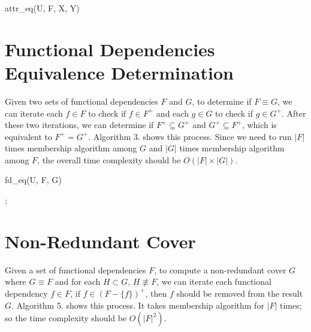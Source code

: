 \documentclass[11pt]{book}
\begin{document}
\begin{algorithm}

  \caption{attr\_eq(U, F, X, Y)}
  
  \SetAlgoLined
    
  
\end{algorithm}

\section{Functional Dependencies Equivalence Determination}

Given two sets of functional dependencies $F$ and $G$, to determine if $F \equiv G$, we can iterate each $f \in F$ to check if $f \in F^{+}$ and each $g \in G$ to check if $g \in G^{+}$. After these two iterations, we can determine if $F^{+} \subseteq G^{+}$ and $G^{+} \subseteq F^{+}$, which is equivalent to $F^{+} = G^{+}$. Algorithm 3. shows this process. Since we need to run $|F|$ times membership algorithm among $G$ and $|G|$ times membership algorithm among $F$, the overall time complexity should be $O(|F| \times |G|)$.

\begin{algorithm}

  \caption{fd\_eq(U, F, G)}
  
  \SetAlgoLined
  
  

  ;
  
\end{algorithm}

\section{Non-Redundant Cover}

Given a set of functional dependencies $F$, to compute a non-redundant cover $G$ where $G \equiv F$ and for each $H \subset G$, $H \not \equiv F$, we can iterate each functional dependency $f \in F$, if $f \in (F - \{ f \})^{+}$, then $f$ should be removed from the result $G$. Algorithm 5. shows this process. It takes membership algorithm for $|F|$ times; so the time complexity should be $O(|F|^2)$.
\end{document}
